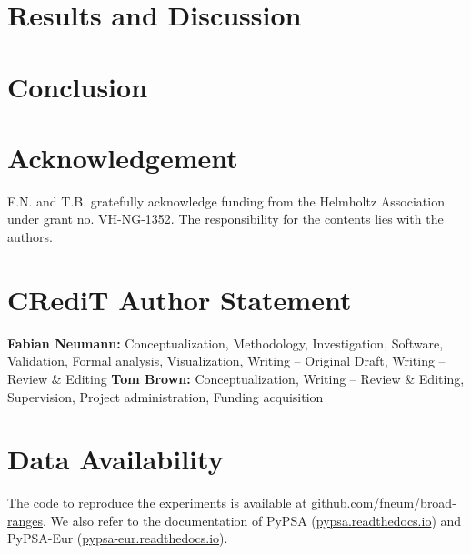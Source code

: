 \documentclass[1p,11pt]{elsarticle}
\begin{document}
\section{Results and Discussion}
\label{sec:results}



\section{Conclusion}
\label{sec:conclusion}



\section*{Acknowledgement}

F.N. and T.B. gratefully acknowledge funding from the Helmholtz
Association under grant no. VH-NG-1352.
The responsibility for the contents lies with the authors.

\section*{CRediT Author Statement}

\textbf{Fabian Neumann:} Conceptualization, Methodology, Investigation, Software, Validation, Formal analysis, Visualization, Writing -- Original Draft, Writing -- Review \& Editing
\textbf{Tom Brown:} Conceptualization, Writing -- Review \& Editing, Supervision, Project administration, Funding acquisition

\section*{Data Availability}

The code to reproduce the experiments is available at \href{https://github.com/fneum/broad-ranges}{github.com/fneum/broad-ranges}.
We also refer to the documentation of PyPSA (\href{https://pypsa.readthedocs.io}{pypsa.readthedocs.io}) and
PyPSA-Eur (\href{https://pypsa-eur.readthedocs.io}{pypsa-eur.readthedocs.io}).

\renewcommand{\ttdefault}{\sfdefault}


% 	
\end{document}
